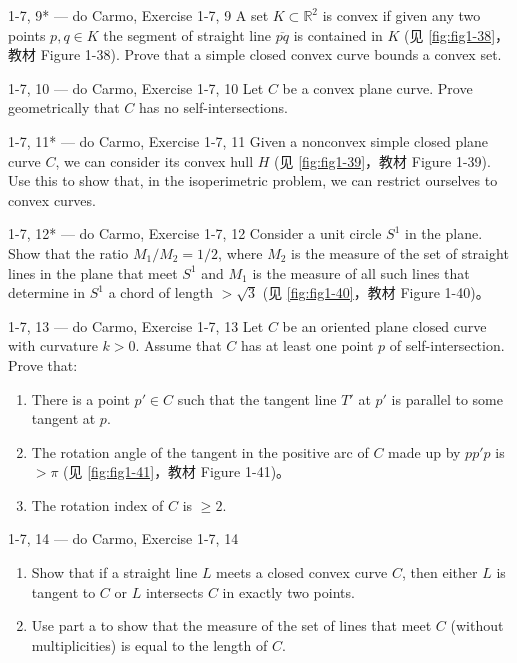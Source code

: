 \begin{exercise}{1-7, 9* — do Carmo, Exercise 1-7, 9}
A set $K \subset \mathbb{R}^2$ is convex if given any two points $p, q \in K$ the segment of straight line $\overline{pq}$ is contained in $K$ (见 \cref{fig:fig1-38}，教材 Figure 1-38). Prove that a simple closed convex curve bounds a convex set.
\end{exercise}

\begin{exercise}{1-7, 10 — do Carmo, Exercise 1-7, 10}
Let $C$ be a convex plane curve. Prove geometrically that $C$ has no self-intersections.
\end{exercise}

\begin{exercise}{1-7, 11* — do Carmo, Exercise 1-7, 11}
Given a nonconvex simple closed plane curve $C$, we can consider its convex hull $H$ (见 \cref{fig:fig1-39}，教材 Figure 1-39). Use this to show that, in the isoperimetric problem, we can restrict ourselves to convex curves.
\end{exercise}

\begin{exercise}{1-7, 12* — do Carmo, Exercise 1-7, 12}
Consider a unit circle $S^1$ in the plane. Show that the ratio $M_1/M_2 = 1/2$, where $M_2$ is the measure of the set of straight lines in the plane that meet $S^1$ and $M_1$ is the measure of all such lines that determine in $S^1$ a chord of length $> \sqrt{3}$ (见 \cref{fig:fig1-40}，教材 Figure 1-40)。
\end{exercise}

\begin{exercise}{1-7, 13 — do Carmo, Exercise 1-7, 13}
Let $C$ be an oriented plane closed curve with curvature $k > 0$. Assume that $C$ has at least one point $p$ of self-intersection. Prove that:
\begin{enumerate}
\item[a.] There is a point $p' \in C$ such that the tangent line $T'$ at $p'$ is parallel to some tangent at $p$.
\item[b.] The rotation angle of the tangent in the positive arc of $C$ made up by $pp'p$ is $> \pi$ (见 \cref{fig:fig1-41}，教材 Figure 1-41)。
\item[c.] The rotation index of $C$ is $\geq 2$.
\end{enumerate}
\end{exercise}

\begin{exercise}{1-7, 14 — do Carmo, Exercise 1-7, 14}
\begin{enumerate}
\item[a.] Show that if a straight line $L$ meets a closed convex curve $C$, then either $L$ is tangent to $C$ or $L$ intersects $C$ in exactly two points.
\item[b.] Use part a to show that the measure of the set of lines that meet $C$ (without multiplicities) is equal to the length of $C$.
\end{enumerate}
\end{exercise}


